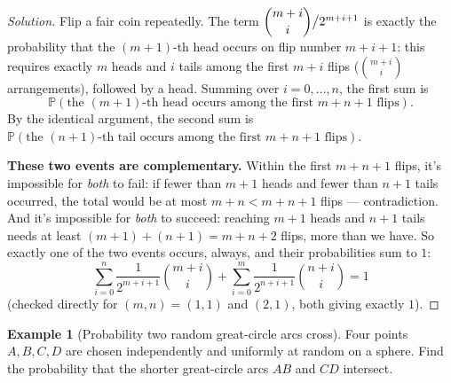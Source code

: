 \documentclass[11pt]{article}
\theoremstyle{definition}
\newtheorem{example}{Example}[section]
\begin{document}
\begin{proof}[Solution]
Flip a fair coin repeatedly. The term $\dbinom{m+i}i\big/2^{m+i+1}$ is exactly the probability that the $(m{+}1)$-th head occurs on flip number $m+i+1$: this requires exactly $m$ heads and $i$ tails among the first $m+i$ flips ($\binom{m+i}i$ arrangements), followed by a head. Summing over $i=0,\dots,n$, the first sum is
\[
\mathbb P(\text{the } (m{+}1)\text{-th head occurs among the first } m+n+1 \text{ flips}).
\]
By the identical argument, the second sum is $\mathbb P(\text{the } (n{+}1)\text{-th tail occurs among the first } m+n+1 \text{ flips})$.

\textbf{These two events are complementary.} Within the first $m+n+1$ flips, it's impossible for \emph{both} to fail: if fewer than $m+1$ heads and fewer than $n+1$ tails occurred, the total would be at most $m+n<m+n+1$ flips — contradiction. And it's impossible for \emph{both} to succeed: reaching $m+1$ heads and $n+1$ tails needs at least $(m+1)+(n+1)=m+n+2$ flips, more than we have. So exactly one of the two events occurs, always, and their probabilities sum to $1$:
\[
\boxed{\sum_{i=0}^n\frac1{2^{m+i+1}}\binom{m+i}i+\sum_{i=0}^m\frac1{2^{n+i+1}}\binom{n+i}i=1}
\]
(checked directly for $(m,n)=(1,1)$ and $(2,1)$, both giving exactly $1$).
\end{proof}

\begin{example}[Probability two random great-circle arcs cross]
Four points $A,B,C,D$ are chosen independently and uniformly at random on a sphere. Find the probability that the shorter great-circle arcs $AB$ and $CD$ intersect.
\end{example}
\end{document}
